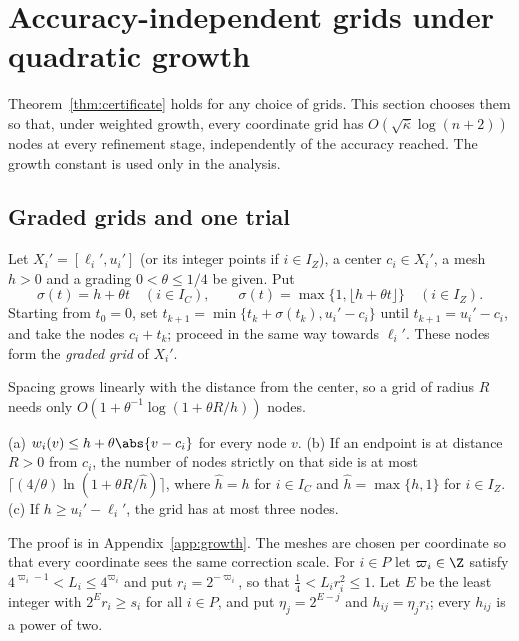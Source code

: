 \section{Accuracy-independent grids under quadratic growth}\label{sec:growth}

Theorem~\ref{thm:certificate} holds for any choice of grids. This section
chooses them so that, under weighted growth, every coordinate grid has
$O(\sqrt{\bar\kappa}\log(n+2))$ nodes at every refinement stage, independently
of the accuracy reached. The growth constant is used only in the analysis.

\subsection{Graded grids and one trial}

\begin{definition}\label{def:graded}
Let $X_i'=[\ell_i',u_i']$ (or its integer points if $i\in I_Z$), a center
$c_i\in X_i'$, a mesh $h>0$ and a grading $0<\theta\le1/4$ be given. Put
\begin{equation}\label{eq:step}
\sigma(t)=h+\theta t\quad(i\in I_C),\qquad
\sigma(t)=\max\{1,\lfloor h+\theta t\rfloor\}\quad(i\in I_Z).
\end{equation}
Starting from $t_0=0$, set $t_{k+1}=\min\{t_k+\sigma(t_k),u_i'-c_i\}$ until
$t_{k+1}=u_i'-c_i$, and take the nodes $c_i+t_k$; proceed in the same way
towards $\ell_i'$. These nodes form the \emph{graded grid} of $X_i'$.
\end{definition}

Spacing grows linearly with the distance from the center, so a grid of radius
$R$ needs only $O(1+\theta^{-1}\log(1+\theta R/h))$ nodes.

\begin{lemma}\label{lem:graded}
(a) $w_i(v)\le h+\theta\abs{v-c_i}$ for every node $v$.
(b) If an endpoint is at distance $R>0$ from $c_i$, the number of nodes
strictly on that side is at most $\lceil(4/\theta)\ln(1+\theta R/\hat h)\rceil$,
where $\hat h=h$ for $i\in I_C$ and $\hat h=\max\{h,1\}$ for $i\in I_Z$.
(c) If $h\ge u_i'-\ell_i'$, the grid has at most three nodes.
\end{lemma}

The proof is in Appendix~\ref{app:growth}. The meshes are chosen per
coordinate so that every coordinate sees the same correction scale. For
$i\in P$ let $\varpi_i\in\Z$ satisfy $4^{\varpi_i-1}<L_i\le4^{\varpi_i}$ and
put $r_i=2^{-\varpi_i}$, so that $\frac14<L_ir_i^2\le1$. Let $E$ be the least
integer with $2^Er_i\ge s_i$ for all $i\in P$, and put $\eta_j=2^{E-j}$ and
$h_{ij}=\eta_jr_i$; every $h_{ij}$ is a power of two.

